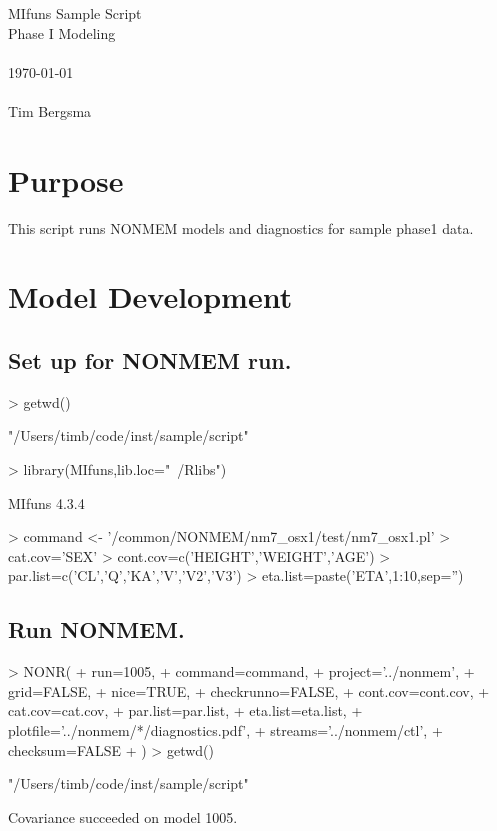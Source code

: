 
\usepackage{Sweave}

 

\vspace*{2cm}
\begin{center}
{\Large MIfuns Sample Script}\\
\vspace{1.5cm}
{\Large Phase I Modeling}\\
~\\
\today\\
~\\
Tim Bergsma\\
\end{center}
\newpage

\section{Purpose}
This script runs NONMEM models and diagnostics for sample phase1 data.
\section{Model Development}
\subsection{Set up for NONMEM run.}
\begin{Schunk}
\begin{Sinput}
> getwd()
\end{Sinput}
\begin{Soutput}
[1] "/Users/timb/code/inst/sample/script"
\end{Soutput}
\begin{Sinput}
> library(MIfuns,lib.loc="~/Rlibs")
\end{Sinput}
\begin{Soutput}
MIfuns 4.3.4 
\end{Soutput}
\begin{Sinput}
> command <- '/common/NONMEM/nm7_osx1/test/nm7_osx1.pl'
> cat.cov='SEX'
> cont.cov=c('HEIGHT','WEIGHT','AGE')
> par.list=c('CL','Q','KA','V','V2','V3')
> eta.list=paste('ETA',1:10,sep='')
\end{Sinput}
\end{Schunk}
\subsection{Run NONMEM.}
\begin{Schunk}
\begin{Sinput}
> NONR(
+      run=1005,
+      command=command,
+      project='../nonmem',
+      grid=FALSE,
+      nice=TRUE,
+      checkrunno=FALSE,
+      cont.cov=cont.cov,
+      cat.cov=cat.cov,
+      par.list=par.list,
+      eta.list=eta.list,
+      plotfile='../nonmem/*/diagnostics.pdf',
+      streams='../nonmem/ctl',
+      checksum=FALSE
+ )
> getwd()
\end{Sinput}
\begin{Soutput}
[1] "/Users/timb/code/inst/sample/script"
\end{Soutput}
\end{Schunk}
Covariance succeeded on model 1005.
